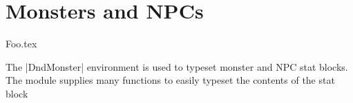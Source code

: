 \chapter{Monsters and NPCs}
\label{p:1:ch:3}

{Foo.tex}

The |DndMonster| environment is used to typeset monster and NPC stat blocks. The module supplies many functions to easily typeset the contents of the stat block